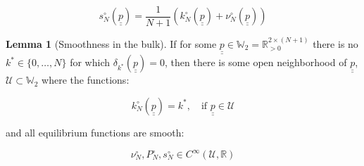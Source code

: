 \documentclass{article}
\theoremstyle{definition}
\newtheorem{lemma}{Lemma}[section]
\begin{document}
\begin{equation}
    s^\circ_N(\underline{\underline{p}}) = \frac{1}{N+1} \left (
    k^\circ_N(\underline{\underline{p}}) + \nu^\circ_N(\underline{\underline{p}})
    \right )
\end{equation}

\begin{lemma}[Smoothness in the bulk]
    \label{lemma:SmoothnessOfFisherPolicies}
    If for some $\underline{\underline{p}} \in \mathbb{W}_2 =\mathbb{R}_{>0}^{2 \times (N+1)}$ there is no $k^* \in \{0,\dots,N\}$ for which $\delta_{k^*}(\underline{\underline{p}}) = 0$, then there is some open neighborhood of $\underline{\underline{p}}$, $\mathcal{U} \subset \mathbb{W}_2$ where the functions:

    \begin{equation}
        k^\circ_N(\underline{\underline{p}}) = k^*, \quad \text{if } \underline{\underline{p}} \in \mathcal{U}
    \end{equation}

  and all equilibrium functions are smooth:

    \begin{equation}
        \nu^\circ_N, P^\circ_N, s^\circ_N \in C^\infty(\mathcal{U}, \mathbb{R})
    \end{equation}
    
\end{lemma}
\end{document}
